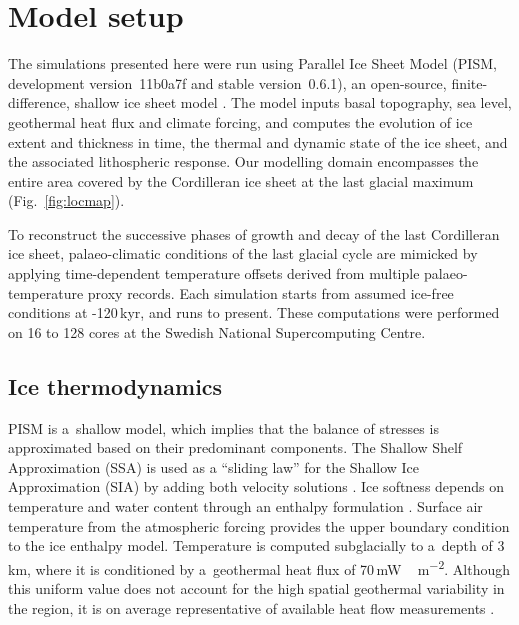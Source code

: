 \documentclass[tc, manuscript]{copernicus}
\begin{document}
\section{Model setup}
\label{sec:model}

The simulations presented here were run using Parallel Ice Sheet Model (PISM,
development version~11b0a7f and stable version~0.6.1), an open-source,
finite-difference, shallow ice sheet model \citep{PISM-authors.2014}.
The model inputs basal topography, sea level, geothermal
heat flux and climate forcing, and computes the evolution of ice extent
and thickness in time, the thermal and dynamic state of the ice sheet, and
the associated lithospheric response. Our modelling domain encompasses the
entire area covered by the Cordilleran ice sheet at the last glacial maximum
(Fig.~\ref{fig:locmap}).

To reconstruct the successive phases of growth and decay of the last Cordilleran
ice sheet, palaeo-climatic conditions of the last glacial cycle are mimicked
by applying time-dependent temperature offsets derived from multiple
palaeo-temperature proxy records. Each simulation starts from assumed ice-free
conditions at -120\,kyr, and runs to present. These computations were
performed on 16 to 128 cores at the Swedish National Supercomputing Centre.

\subsection{Ice thermodynamics}

PISM is a~shallow model, which implies that the balance of stresses is
approximated based on their predominant components.
The Shallow Shelf Approximation (SSA) is used as a ``sliding law'' for the
Shallow Ice Approximation (SIA) by adding both velocity solutions
\citep[Eqn.~15]{Winkelmann.etal.2011}.
Ice softness depends on temperature and water content through an enthalpy
formulation \citep{Aschwanden.etal.2012}. Surface air
temperature from the atmospheric forcing provides the upper boundary condition
to the ice enthalpy model. Temperature is computed subglacially to a~depth of
3\,km, where it is conditioned by a~geothermal heat flux of
70\,\unit{mW\,m^{-2}}. Although this uniform value does not
account for the high spatial geothermal variability in the region, it is on
average representative of available heat flow measurements
\citep{Blackwell.Richards.2004}.
\end{document}
